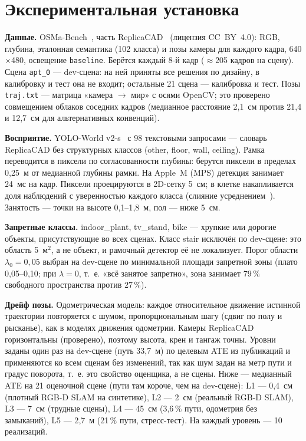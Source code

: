 \section{Экспериментальная установка}

\textbf{Данные.} OSMa-Bench~\cite{osmabench}, часть ReplicaCAD~\cite{habitat2} (лицензия CC~BY~4.0): RGB, глубина, эталонная семантика (102 класса) и позы камеры для каждого кадра, 640$\times$480, освещение \texttt{baseline}. Берётся каждый 8-й кадр ($\approx$205 кадров на сцену). Сцена \texttt{apt\_0} --- dev-сцена: на ней приняты все решения по дизайну, в калибровку и тест она не входит; остальные 21 сцена --- калибровка и тест. Позы \texttt{traj.txt} --- матрица «камера $\to$ мир» с осями OpenCV; это проверено совмещением облаков соседних кадров (медианное расстояние 2{,}1~см против 21{,}4 и 12{,}7~см для альтернативных конвенций).

\textbf{Восприятие.} YOLO-World v2-s~\cite{yoloworld} с 98 текстовыми запросами --- словарь ReplicaCAD без структурных классов (other, floor, wall, ceiling). Рамка переводится в пиксели по согласованности глубины: берутся пиксели в пределах 0{,}25~м от медианной глубины рамки. На Apple~M (MPS) детекция занимает 24~мс на кадр. Пиксели проецируются в 2D-сетку 5~см; в клетке накапливается доля наблюдений с уверенностью каждого класса (слияние усреднением~\cite{overconf}). Занятость --- точки на высоте 0{,}1--1{,}8~м, пол --- ниже 5~см.

\textbf{Запретные классы.} indoor\_plant, tv\_stand, bike --- хрупкие или дорогие объекты, присутствующие во всех сценах. Класс stair исключён по dev-сцене: это область 5~м$^2$, а не объект, и рамочный детектор её не локализует. Порог области $\lambda_0 = 0{,}05$ выбран на dev-сцене по минимальной площади запретной зоны (плато 0{,}05--0{,}10; при $\lambda = 0$, т.~е. «всё занятое запретно», зона занимает $79\,\%$ свободного пространства против $27\,\%$).

\textbf{Дрейф позы.} Одометрическая модель: каждое относительное движение истинной траектории повторяется с шумом, пропорциональным шагу (сдвиг по полу и рысканье), как в моделях движения одометрии. Камеры ReplicaCAD горизонтальны (проверено), поэтому высота, крен и тангаж точны. Уровни заданы один раз на dev-сцене (путь 33{,}7~м) по целевым ATE из публикаций и применяются ко всем сценам без изменений, так как шум задан на метр пути и градус поворота, т.~е. это свойство оценщика, а не сцены. Ниже --- медианный ATE на 21 оценочной сцене (пути там короче, чем на dev-сцене): L1 --- 0{,}4~см (плотный RGB-D SLAM на синтетике), L2 --- 2~см (реальный RGB-D SLAM), L3 --- 7~см (трудные сцены), L4 --- 45~см (3{,}6\,\% пути, одометрия без замыканий), L5 --- 2{,}7~м (21\,\% пути, стресс-тест). На каждый уровень --- 10 реализаций.


